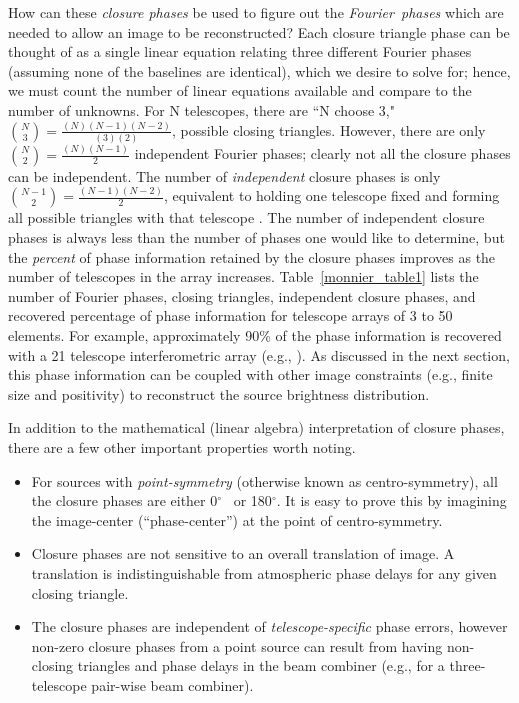 \documentclass[12pt]{article}
\def\arcdegg{\hbox{$^\circ$}}
\begin{document}
\label{monnier_relations}
How can these {\em closure phases} be used to figure out the {\em
  Fourier~phases} which are needed to allow an image to be
reconstructed?  Each closure triangle phase can be thought of as a
single linear equation relating three different Fourier phases
(assuming none of the baselines are identical), which we desire to
solve for; hence, we must count the number of linear equations
available and compare to the number of unknowns.  For N telescopes,
there are ``N choose 3,"
${{N}\choose{3}}=\frac{(N)(N-1)(N-2)}{(3)(2)}$, possible closing
triangles.  However, there are only
${{N}\choose{2}}=\frac{(N)(N-1)}{2}$ independent Fourier phases;
clearly not all the closure phases can be independent.  The number of
{\em independent} closure phases is only
${{N-1}\choose{2}}=\frac{(N-1)(N-2)}{2}$, equivalent to holding one
telescope fixed and forming all possible triangles with that telescope
\citep[as discussed by][]{readhead88}.  The number of independent
closure phases is always less than the number of phases one would like
to determine, but the {\em percent} of phase information retained by
the closure phases improves as the number of telescopes in the array
increases.  Table~\ref{monnier_table1} lists the number of Fourier
phases, closing triangles, independent closure phases, and recovered
percentage of phase information for telescope arrays of 3 to 50
elements.  For example, approximately 90\% of the phase information is
recovered with a 21 telescope interferometric array (e.g.,
\citealt{readhead88}).  As discussed in the next section, this phase
information can be coupled with other image constraints (e.g., finite
size and positivity) to reconstruct the source brightness
distribution.

In addition to the mathematical (linear algebra) interpretation of
closure phases, there are a few other important properties worth
noting.

\begin{itemize}
\item{For sources with {\em point-symmetry} (otherwise known as
    centro-symmetry), all the closure phases are either 0\arcdegg~ or
    180\arcdegg.  It is easy to prove this by imagining the
    image-center (``phase-center'') at the point of centro-symmetry.}
\item{Closure phases are not sensitive to an overall translation of image.
A translation is indistinguishable from atmospheric phase delays for any
given closing triangle.}
\item{The closure phases are independent of {\em telescope-specific}
    phase errors, however non-zero closure phases from a point source
    can result from having non-closing triangles and phase delays in
    the beam combiner (e.g., for a three-telescope pair-wise beam
    combiner).}
\end{itemize}
\end{document}
